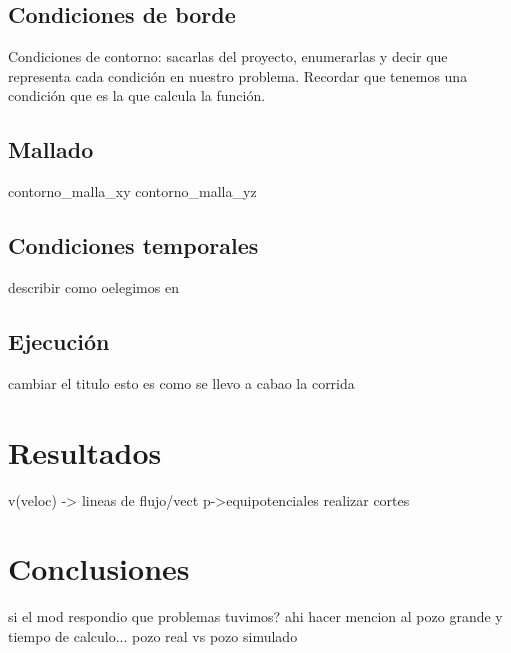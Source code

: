 \documentclass[10pt,a4paper,final]{article}
\begin{document}
%
\subsection{Condiciones de borde}
Condiciones de contorno: sacarlas del proyecto, enumerarlas y decir
que representa cada condición en nuestro problema. Recordar que
tenemos una condición que es la que calcula la función.
%
\subsection{Mallado}
contorno_malla_xy
contorno_malla_yz
%
\subsection{Condiciones temporales}
describir como oelegimos en
%
%
\subsection{Ejecución}
cambiar el titulo esto es como se llevo a cabao la corrida
\section{Resultados}
v(veloc) -> lineas de flujo/vect
p->equipotenciales
realizar cortes
\section{Conclusiones}
si el mod respondio
que problemas tuvimos? ahi hacer mencion al pozo grande y tiempo de calculo...
pozo real vs pozo simulado
\end{document}
